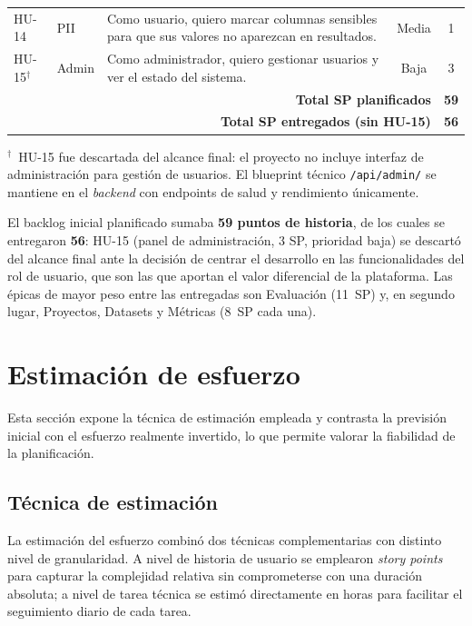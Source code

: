 \begin{table}[!t]
\begin{tabularx}{\textwidth}{l l X c c}
    HU-14 & \ac{PII}       & Como usuario, quiero marcar columnas sensibles para que
      sus valores no aparezcan en resultados. & Media & 1 \\
    HU-15$^{\dagger}$ & Admin & Como administrador, quiero gestionar usuarios y
      ver el estado del sistema. & Baja & 3 \\
    \midrule
    \multicolumn{4}{r}{\textbf{Total SP planificados}} & \textbf{59} \\
    \multicolumn{4}{r}{\textbf{Total SP entregados (sin HU-15)}} & \textbf{56} \\
    \bottomrule
  \end{tabularx}
  \medskip\par\small
  $^{\dagger}$~HU-15 fue descartada del alcance final: el proyecto no
  incluye interfaz de administración para gestión de usuarios.  El
  blueprint técnico \texttt{/api/admin/} se mantiene en el \emph{backend}
  con endpoints de salud y rendimiento únicamente.
\end{table}

El backlog inicial planificado sumaba \textbf{59 puntos de historia},
de los cuales se entregaron \textbf{56}: HU-15 (panel de administración,
3 \ac{SP}, prioridad baja) se descartó del alcance final ante la decisión de
centrar el desarrollo en las funcionalidades del rol de usuario, que son
las que aportan el valor diferencial de la plataforma.  Las épicas de
mayor peso entre las entregadas son Evaluación (11~\ac{SP}) y, en segundo
lugar, Proyectos, Datasets y Métricas (8~\ac{SP} cada una).


\section{Estimación de esfuerzo}
\label{sec:estimacion}

Esta sección expone la técnica de estimación empleada y contrasta la previsión
inicial con el esfuerzo realmente invertido, lo que permite valorar la
fiabilidad de la planificación.

\subsection{Técnica de estimación}

La estimación del esfuerzo combinó dos técnicas complementarias con
distinto nivel de granularidad.  A nivel de historia de usuario se
emplearon \emph{story points} para capturar la complejidad relativa
sin comprometerse con una duración absoluta; a nivel de tarea técnica
se estimó directamente en horas para facilitar el seguimiento diario
de cada tarea.

